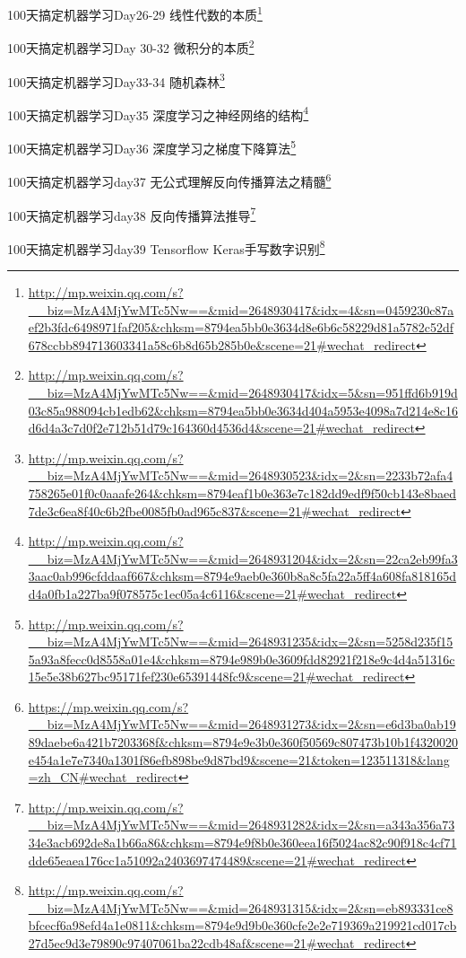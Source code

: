 \documentclass[]{ctexbook}
\renewcommand{\href}[2]{#2\footnote{\url{#1}}}
\begin{document}
\href{http://mp.weixin.qq.com/s?__biz=MzA4MjYwMTc5Nw==\&mid=2648930417\&idx=4\&sn=0459230c87aef2b3fdc6498971faf205\&chksm=8794ea5bb0e3634d8e6b6c58229d81a5782c52df678ccbb894713603341a58c6b8d65b285b0e\&scene=21\#wechat_redirect}{100天搞定机器学习\textbar{}Day26-29 线性代数的本质}

\href{http://mp.weixin.qq.com/s?__biz=MzA4MjYwMTc5Nw==\&mid=2648930417\&idx=5\&sn=951ffd6b919d03c85a988094cb1edb62\&chksm=8794ea5bb0e3634d404a5953e4098a7d214e8c16d6d4a3c7d0f2e712b51d79c164360d4536d4\&scene=21\#wechat_redirect}{100天搞定机器学习\textbar{}Day 30-32 微积分的本质}

\href{http://mp.weixin.qq.com/s?__biz=MzA4MjYwMTc5Nw==\&mid=2648930523\&idx=2\&sn=2233b72afa4758265e01f0c0aaafe264\&chksm=8794eaf1b0e363e7c182dd9edf9f50cb143e8baed7de3c6ea8f40c6b2fbe0085fb0ad965c837\&scene=21\#wechat_redirect}{100天搞定机器学习\textbar{}Day33-34 随机森林}

\href{http://mp.weixin.qq.com/s?__biz=MzA4MjYwMTc5Nw==\&mid=2648931204\&idx=2\&sn=22ca2eb99fa33aac0ab996cfddaaf667\&chksm=8794e9aeb0e360b8a8c5fa22a5ff4a608fa818165dd4a0fb1a227ba9f078575c1ec05a4c6116\&scene=21\#wechat_redirect}{100天搞定机器学习\textbar{}Day35 深度学习之神经网络的结构}

\href{http://mp.weixin.qq.com/s?__biz=MzA4MjYwMTc5Nw==\&mid=2648931235\&idx=2\&sn=5258d235f155a93a8fecc0d8558a01e4\&chksm=8794e989b0e3609fdd82921f218e9c4d4a51316c15e5e38b627bc95171fef230e65391448fc9\&scene=21\#wechat_redirect}{100天搞定机器学习\textbar{}Day36 深度学习之梯度下降算法}

\href{https://mp.weixin.qq.com/s?__biz=MzA4MjYwMTc5Nw==\&mid=2648931273\&idx=2\&sn=e6d3ba0ab1989daebe6a421b7203368f\&chksm=8794e9e3b0e360f50569c807473b10b1f4320020e454a1e7e7340a1301f86efb898be9d87bd9\&scene=21\&token=123511318\&lang=zh_CN\#wechat_redirect}{100天搞定机器学习\textbar{}day37 无公式理解反向传播算法之精髓}

\href{http://mp.weixin.qq.com/s?__biz=MzA4MjYwMTc5Nw==\&mid=2648931282\&idx=2\&sn=a343a356a7334e3acb692de8a1b66a86\&chksm=8794e9f8b0e360eea16f5024ac82c90f918c4cf71dde65eaea176cc1a51092a2403697474489\&scene=21\#wechat_redirect}{100天搞定机器学习\textbar{}day38 反向传播算法推导}

\href{http://mp.weixin.qq.com/s?__biz=MzA4MjYwMTc5Nw==\&mid=2648931315\&idx=2\&sn=eb893331ce8bfcecf6a98efd4a1e0811\&chksm=8794e9d9b0e360cfe2e2e719369a219921cd017cb27d5ec9d3e79890c97407061ba22cdb48af\&scene=21\#wechat_redirect}{100天搞定机器学习\textbar{}day39 Tensorflow Keras手写数字识别}
\end{document}
